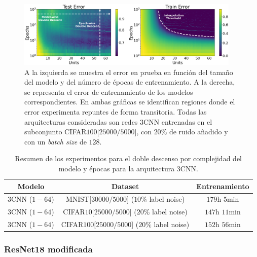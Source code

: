 \begin{figure}[h]
    \centering
    \includegraphics[width=0.95\textwidth]{img/experiments/model-epoch3CNNCIFAR10025k.png}
    \caption[Doble descenso en función del tamaño del modelo y del número de épocas para la red $3$CNN y un subconjunto de CIFAR$100$.]{A la izquierda se muestra el error en prueba en función del tamaño del modelo y del número de épocas de entrenamiento. A la derecha, se representa el error de entrenamiento de los modelos correspondientes. En ambas gráficas se identifican regiones donde el error experimenta repuntes de forma transitoria. Todas las arquitecturas consideradas son redes $3$CNN entrenadas en el subconjunto CIFAR$100$[$25000/5000$], con $20\%$ de ruido añadido y con un \textit{batch size} de $128$.}\label{fig:model-epoch3CNNCIFAR10025k}
\end{figure}

\begin{table}[h!]
    \centering
    \begin{tabular}{|c|c|c|}
    \hline
    \textbf{Modelo}       & \textbf{Dataset} & \textbf{Entrenamiento} \\ 
    \hline
    $3$CNN ($1-64$)      & MNIST[$30000/5000$] ($10$\% label noise)        & $179$h $5$min \\ 
    $3$CNN ($1-64$)      & CIFAR$10$[$25000/5000$]  ($20$\% label noise)   & $147$h $11$min \\
    $3$CNN ($1-64$)      & CIFAR$100$[$25000/5000$]  ($20$\% label noise)   & $152$h $56$min \\
    \hline
    \end{tabular}
    \caption[Resumen de los experimentos para el doble descenso por complejidad del modelo y épocas para la arquitectura $3$CNN.]{Resumen de los experimentos para el doble descenso por complejidad del modelo y épocas para la arquitectura $3$CNN.}\label{tab:3cnn_model-epochwise}
\end{table}

\subsubsection{ResNet18 modificada}\label{subsubsec:model-epoch-wise-ResNet18 modificada}

